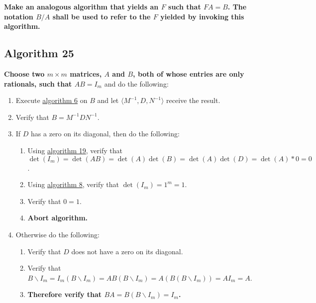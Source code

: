 \documentclass[twocolumn]{article}
\begin{document}
			\textbf{Make an analogous algorithm that yields an $F$ such that $FA=B$. The notation $B/A$ shall be used to refer to the $F$ yielded by invoking this algorithm.}
		\subsection{Algorithm 25}\label{sec:algorithm 25}
			\textbf{Choose two $m\times m$ matrices, $A$ and $B$, both of whose entries are only rationals, such that $AB=I_m$} and do the following:
			\begin{enumerate}
				\item Execute \hyperref[sec:algorithm 6]{algorithm 6} on $B$ and let $\langle M^{-1},D,N^{-1}\rangle$ receive the result.
				\item Verify that $B=M^{-1}DN^{-1}$.
				\item If $D$ has a zero on its diagonal, then do the following:
				\begin{enumerate}
					\item Using \hyperref[sec:algorithm 19]{algorithm 19}, verify that $\det(I_m)=\det(AB)=\det(A)\det(B)=\det(A)\det(D)=\det(A)*0=0$.
					\item Using \hyperref[sec:algorithm 8]{algorithm 8}, verify that $\det(I_m)=1^m=1$.
					\item Verify that $0=1$.
					\item \textbf{Abort algorithm.}
				\end{enumerate}
				\item Otherwise do the following:
				\begin{enumerate}
					\item Verify that $D$ does not have a zero on its diagonal.
					\item Verify that $B\backslash I_m=I_m(B\backslash I_m)=AB(B\backslash I_m)=A(B(B\backslash I_m))=AI_m=A$.
					\item \textbf{Therefore verify that $BA=B(B\backslash I_m)=I_m$.}
				\end{enumerate}
			\end{enumerate}
\end{document}
